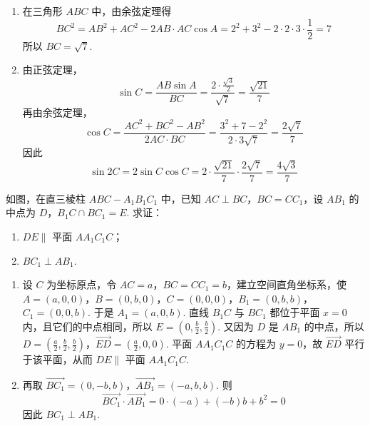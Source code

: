 \begin{solution}
\begin{enumerate}
\item
在三角形 \(ABC\) 中，由余弦定理得
\[
BC^{2}=AB^{2}+AC^{2}-2AB\cdot AC\cos A=2^{2}+3^{2}-2\cdot2\cdot3\cdot\frac12=7
\]
所以 \(BC=\sqrt{7}\).

\item
由正弦定理，
\[
\sin C=\frac{AB\sin A}{BC}=\frac{2\cdot\frac{\sqrt{3}}{2}}{\sqrt{7}}=\frac{\sqrt{21}}{7}
\]
再由余弦定理，
\[
\cos C=\frac{AC^{2}+BC^{2}-AB^{2}}{2AC\cdot BC}=\frac{3^{2}+7-2^{2}}{2\cdot3\sqrt{7}}=\frac{2\sqrt{7}}{7}
\]
因此
\[
\sin2C=2\sin C\cos C=2\cdot\frac{\sqrt{21}}{7}\cdot\frac{2\sqrt{7}}{7}=\frac{4\sqrt{3}}{7}
\]
\end{enumerate}
\end{solution}

\begin{problem}
如图，在直三棱柱 \(ABC-A_1B_1C_1\) 中，已知 \(AC \perp BC\)，\(BC = CC_1\)，设 \(AB_1\) 的中点为 \(D\)，\(B_1C \cap BC_1 = E\). 求证：

\begin{enumerate}
\item \(DE \parallel\) 平面 \(AA_1C_1C\)；
\item \(BC_1 \perp AB_1\).
\end{enumerate}

\end{problem}

\begin{solution}
\begin{enumerate}
\item
设 \(C\) 为坐标原点，令 \(AC=a\)，\(BC=CC_1=b\)，建立空间直角坐标系，使
 \(A=(a,0,0)\)，\(B=(0,b,0)\)，\(C=(0,0,0)\)，\(B_1=(0,b,b)\)，\(C_1=(0,0,b)\).
于是 \(A_1=(a,0,b)\). 直线 \(B_1C\) 与 \(BC_1\) 都位于平面 \(x=0\) 内，且它们的中点相同，所以
 \(E=\left(0,\frac b2,\frac b2\right)\).
又因为 \(D\) 是 \(AB_1\) 的中点，所以
 \(D=\left(\frac a2,\frac b2,\frac b2\right)\)，\(\overrightarrow{ED}=\left(\frac a2,0,0\right)\).
平面 \(AA_1C_1C\) 的方程为 \(y=0\)，故 \(\overrightarrow{ED}\) 平行于该平面，从而 \(DE\parallel\) 平面 \(AA_1C_1C\).

\item
再取
 \(\overrightarrow{BC_1}=(0,-b,b)\)，\(\overrightarrow{AB_1}=(-a,b,b)\).
则
\[
\overrightarrow{BC_1}\cdot\overrightarrow{AB_1}=0\cdot(-a)+(-b)b+b^{2}=0
\]
因此 \(BC_1\perp AB_1\).
\end{enumerate}
\end{solution}

